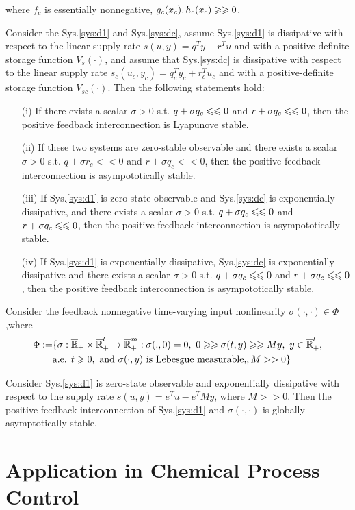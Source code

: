 \documentclass{paper}
\begin{document}
where $f_c$ is essentially nonnegative, $g_c(x_c),h_c(x_c)\geqslant\geqslant 0$.
\begin{thm}
Consider the Sys.\ref{sys:d1} and Sys.\ref{sys:dc}, assume Sys.\ref{sys:d1} is dissipative with respect to the linear supply rate
$s(u,y)=q^Ty+r^Tu$ and with a positive-definite storage function $V_s(\cdot)$, and assume that Sys.\ref{sys:dc} is dissipative 
with respect to the linear supply rate $s_c(u_c,y_c)=q_c^Ty_c+r_c^Tu_c$ and with a positive-definite storage function $V_{sc}(\cdot)$.
Then the following statements hold:
\begin{enumerate}
\item[(i)]   If there exists a scalar $\sigma>0$ s.t. $q+\sigma q_c\leqslant\leqslant 0$ and $r+\sigma q_c\leqslant\leqslant 0$, then the positive feedback interconnection
is Lyapunove stable.
\item[(ii)]  If these two systems are zero-stable observable and there exists a scalar $\sigma>0$ s.t. $q+\sigma r_c<<0$ and 
$r+\sigma q_c<<0$, then the positive feedback interconnection is asympototically stable.
\item[(iii)] If Sys.\ref{sys:d1} is zero-state observable and Sys.\ref{sys:dc} is exponentially dissipative, and there exists 
a scalar $\sigma>0$ s.t. $q+\sigma q_c\leqslant\leqslant 0$ and $r+\sigma q_c\leqslant\leqslant 0$, then the positive feedback interconnection is asympototically stable.
\item[(iv)]  If Sys.\ref{sys:d1} is exponentially dissipative, Sys.\ref{sys:dc} is exponentially dissipative and there exists 
a scalar $\sigma>0$ s.t. $q+\sigma q_c\leqslant\leqslant 0$ and $r+\sigma q_c\leqslant\leqslant 0$, then the positive feedback interconnection is asympototically stable.
\end{enumerate}
\end{thm}
Consider the feedback nonnegative time-varying input nonlinearity $\sigma(\cdot,\cdot)\in\Phi$,where
\begin{align}
\Phi:=&\lbrace\sigma:\overline{\mathbb{R}}_{+}\times\overline{\mathbb{R}}_{+}^l\rightarrow \overline{\mathbb{R}}_{+}^m: 
\sigma(.,0)=0,\text{ }0\geqslant\geqslant\sigma(t,y)\geqslant\geqslant My,\text{ } y\in\overline{\mathbb{R}}_{+}^l, \nonumber \\
\qquad &\text{a.e. } t\geqslant 0, \text{ and } \sigma(\cdot,y) \text{ is Lebesgue measurable,}, M>>0 \rbrace
\end{align}
\begin{thm}
Consider Sys.\ref{sys:d1} is zero-state observable and exponentially dissipative with respect to the supply rate $s(u,y)=e^Tu-e^TMy$, where
$M>>0$. Then the positive feedback interconnection of Sys.\ref{sys:d1} and $\sigma(\cdot,\cdot)$ is globally asymptotically stable.
\end{thm}
\section{Application in Chemical Process Control}



\end{document}
